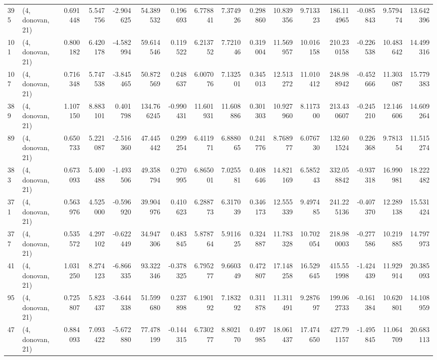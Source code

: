 \begin{tabular}{llrrrrrrrrrrrrrr}
395 &  (4, donovan, 21) &   0.691448 &   5.547756 &  -2.904625 &    54.389532 &   0.196693 &   6.778841 &   7.374926 &  0.298860 &  10.839356 &   9.713323 &   186.114965 & -0.085843 &   9.579474 &  13.642396 \\
101 &  (4, donovan, 21) &   0.800182 &   6.420178 &  -4.582994 &    59.614546 &   0.119522 &   6.213752 &   7.721046 &  0.319004 &  11.569957 &  10.016158 &   210.230158 & -0.226538 &  10.483642 &  14.499316 \\
107 &  (4, donovan, 21) &   0.716348 &   5.747538 &  -3.845465 &    50.872569 &   0.248637 &   6.007076 &   7.132501 &  0.345013 &  12.513272 &  11.010412 &   248.988942 & -0.452666 &  11.303087 &  15.779383 \\
389 &  (4, donovan, 21) &   1.107150 &   8.883101 &   0.401798 &   134.766245 &  -0.990431 &  11.601931 &  11.608886 &  0.301303 &  10.927960 &   8.117300 &   213.430607 & -0.245210 &  12.146606 &  14.609264 \\
89  &  (4, donovan, 21) &   0.650733 &   5.221087 &  -2.516360 &    47.445442 &   0.299254 &   6.411971 &   6.888065 &  0.241776 &   8.768977 &   6.076730 &   132.601524 &  0.226368 &   9.781354 &  11.515274 \\
383 &  (4, donovan, 21) &   0.673093 &   5.400488 &  -1.493506 &    49.358794 &   0.270995 &   6.865001 &   7.025581 &  0.408646 &  14.821169 &   6.585243 &   332.058842 & -0.937318 &  16.990981 &  18.222482 \\
371 &  (4, donovan, 21) &   0.563976 &   4.525000 &  -0.596920 &    39.904976 &   0.410623 &   6.288773 &   6.317039 &  0.346173 &  12.555339 &   9.497485 &   241.225136 & -0.407370 &  12.289138 &  15.531424 \\
377 &  (4, donovan, 21) &   0.535572 &   4.297102 &  -0.622449 &    34.947306 &   0.483845 &   5.878764 &   5.911625 &  0.324887 &  11.783328 &  10.702054 &   218.980003 & -0.277586 &  10.219885 &  14.797973 \\
41  &  (4, donovan, 21) &   1.031250 &   8.274123 &  -6.866335 &    93.322346 &  -0.378325 &   6.795277 &   9.660349 &  0.472807 &  17.148258 &  16.529645 &   415.551998 & -1.424439 &  11.929914 &  20.385093 \\
95  &  (4, donovan, 21) &   0.725807 &   5.823437 &  -3.644338 &    51.599680 &   0.237898 &   6.190192 &   7.183292 &  0.311878 &  11.311491 &   9.287697 &   199.062733 & -0.161384 &  10.620801 &  14.108959 \\
47  &  (4, donovan, 21) &   0.884093 &   7.093422 &  -5.672880 &    77.478199 &  -0.144315 &   6.730277 &   8.802170 &  0.497985 &  18.061437 &  17.474650 &   427.791157 & -1.495845 &  11.064709 &  20.683113 \\

\end{tabular}
